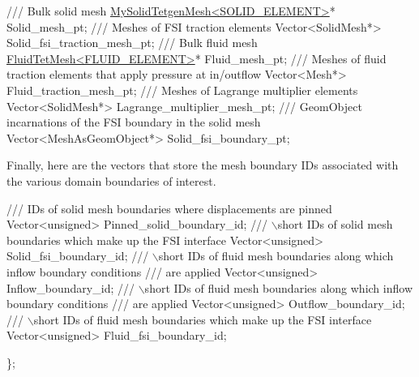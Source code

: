 \begin{DoxyCodeInclude}

\textcolor{comment}{}
\textcolor{comment}{ /// Bulk solid mesh}
\textcolor{comment}{} \hyperlink{classMySolidTetgenMesh}{MySolidTetgenMesh<SOLID\_ELEMENT>}* Solid\_mesh\_pt;
\textcolor{comment}{}
\textcolor{comment}{ /// Meshes of FSI traction elements}
\textcolor{comment}{} Vector<SolidMesh*> Solid\_fsi\_traction\_mesh\_pt;
\textcolor{comment}{}
\textcolor{comment}{ /// Bulk fluid mesh}
\textcolor{comment}{} \hyperlink{classFluidTetMesh}{FluidTetMesh<FLUID\_ELEMENT>}* Fluid\_mesh\_pt;
\textcolor{comment}{}
\textcolor{comment}{ /// Meshes of fluid traction elements that apply pressure at in/outflow}
\textcolor{comment}{} Vector<Mesh*> Fluid\_traction\_mesh\_pt;
\textcolor{comment}{}
\textcolor{comment}{ /// Meshes of Lagrange multiplier elements}
\textcolor{comment}{} Vector<SolidMesh*> Lagrange\_multiplier\_mesh\_pt;
\textcolor{comment}{}
\textcolor{comment}{ /// GeomObject incarnations of the FSI boundary in the solid mesh}
\textcolor{comment}{} Vector<MeshAsGeomObject*>
 Solid\_fsi\_boundary\_pt;

\end{DoxyCodeInclude}


Finally, here are the vectors that store the mesh boundary I\+Ds associated with the various domain boundaries of interest.


\begin{DoxyCodeInclude}
\textcolor{comment}{}
\textcolor{comment}{ /// IDs of solid mesh boundaries where displacements are pinned}
\textcolor{comment}{} Vector<unsigned> Pinned\_solid\_boundary\_id;
  \textcolor{comment}{}
\textcolor{comment}{ /// \(\backslash\)short IDs of solid mesh boundaries which make up the FSI interface}
\textcolor{comment}{} Vector<unsigned> Solid\_fsi\_boundary\_id;
\textcolor{comment}{}
\textcolor{comment}{ /// \(\backslash\)short IDs of fluid mesh boundaries along which inflow boundary conditions}
\textcolor{comment}{ /// are applied}
\textcolor{comment}{} Vector<unsigned> Inflow\_boundary\_id;
\textcolor{comment}{}
\textcolor{comment}{ /// \(\backslash\)short IDs of fluid mesh boundaries along which inflow boundary conditions}
\textcolor{comment}{ /// are applied}
\textcolor{comment}{} Vector<unsigned> Outflow\_boundary\_id;
\textcolor{comment}{}
\textcolor{comment}{ /// \(\backslash\)short IDs of fluid mesh boundaries which make up the FSI interface}
\textcolor{comment}{} Vector<unsigned> Fluid\_fsi\_boundary\_id;

\};

\end{DoxyCodeInclude}




